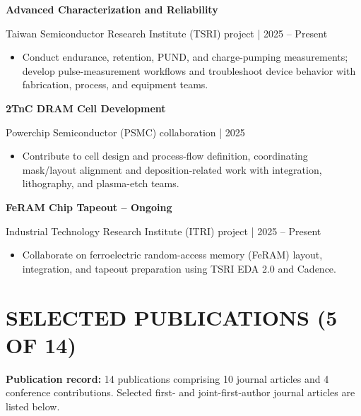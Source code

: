 \documentclass[10pt,a4paper]{article}
\begin{document}
\textbf{Advanced Characterization and Reliability}\par
Taiwan Semiconductor Research Institute (TSRI) project |
2025 -- Present
\begin{itemize}
  \item Conduct endurance, retention, PUND, and charge-pumping
        measurements; develop pulse-measurement workflows and
        troubleshoot device behavior with fabrication,
        process, and equipment teams.
\end{itemize}

\textbf{2TnC DRAM Cell Development}\par
Powerchip Semiconductor (PSMC) collaboration | 2025
\begin{itemize}
  \item Contribute to cell design and process-flow definition,
        coordinating mask/layout alignment and deposition-related
        work with integration, lithography, and plasma-etch teams.
\end{itemize}

\textbf{FeRAM Chip Tapeout -- Ongoing}\par
Industrial Technology Research Institute (ITRI) project |
2025 -- Present
\begin{itemize}
  \item Collaborate on ferroelectric random-access memory
        (FeRAM) layout, integration, and tapeout preparation
        using TSRI EDA 2.0 and Cadence.
\end{itemize}

\section{SELECTED PUBLICATIONS (5 OF 14)}


\textbf{Publication record:}
14 publications comprising 10 journal articles and
4 conference contributions. Selected first- and
joint-first-author journal articles are listed below.
\end{document}
